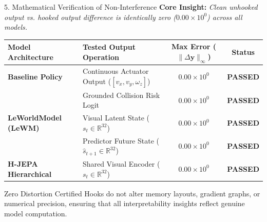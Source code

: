 \documentclass[aspectratio=169, 10pt]{beamer}
\begin{document}
\begin{frame}{5. Mathematical Verification of Non-Interference}
  \textbf{Core Insight:} \textit{Clean unhooked output vs. hooked output difference is identically zero ($0.00\times 10^0$) across all models.}

  \vspace{0.3cm}
  \begin{table}[h]
    \centering
    \small
    \begin{tabular}{llcc}
      \toprule
      \textbf{Model Architecture} & \textbf{Tested Output Operation} & \textbf{Max Error ($\|\Delta \mathbf{y}\|_\infty$)} & \textbf{Status} \\
      \midrule
      \textbf{Baseline Policy} & Continuous Actuator Output ($[v_x, v_y, \omega_z]$) & \textbf{$0.00 \times 10^0$} & \textbf{PASSED} \\
      & Grounded Collision Risk Logit & \textbf{$0.00 \times 10^0$} & \textbf{PASSED} \\
      \midrule
      \textbf{LeWorldModel (LeWM)} & Visual Latent State ($s_t \in \mathbb{R}^{32}$) & \textbf{$0.00 \times 10^0$} & \textbf{PASSED} \\
      & Predictor Future State ($\hat{s}_{t+1} \in \mathbb{R}^{32}$) & \textbf{$0.00 \times 10^0$} & \textbf{PASSED} \\
      \midrule
      \textbf{H-JEPA Hierarchical} & Shared Visual Encoder ($s_t \in \mathbb{R}^{32}$) & \textbf{$0.00 \times 10^0$} & \textbf{PASSED} \\
      \bottomrule
    \end{tabular}
  \end{table}

  \vspace{0.3cm}
  \begin{alertblock}{Zero Distortion Certified}
    \small
    Hooks do not alter memory layouts, gradient graphs, or numerical precision, ensuring that all interpretability insights reflect genuine model computation.
  \end{alertblock}
\end{frame}
\end{document}
